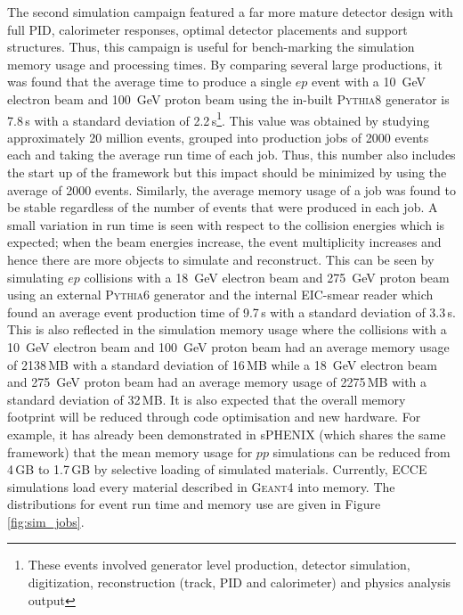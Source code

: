 	The second simulation campaign featured a far more mature detector design with full PID, calorimeter responses, optimal detector placements and support structures. Thus, this campaign is useful for bench-marking the simulation memory usage and processing times. By comparing several large productions, it was found that the average time to produce a single $ep$ event with a 10~GeV electron beam and 100~GeV proton beam using the in-built \textsc{Pythia8} generator is 7.8\,s with a standard deviation of 2.2\,s\footnote{These events involved generator level production, detector simulation, digitization, reconstruction (track, PID and calorimeter) and physics analysis output}. This value was obtained by studying approximately 20 million events, grouped into production jobs of 2000 events each and taking the average run time of each job. Thus, this number also includes the start up of the framework but this impact should be minimized by using the average of 2000 events. Similarly, the average memory usage of a job was found to be stable regardless of the number of events that were produced in each job. A small variation in run time is seen with respect to the collision energies which is expected; when the beam energies increase, the event multiplicity increases and hence there are more objects to simulate and reconstruct. This can be seen by simulating $ep$ collisions with a 18~GeV electron beam and 275~GeV proton beam using an external \textsc{Pythia6} generator and the internal EIC-smear reader which found an average event production time of 9.7\,s with a standard deviation of 3.3\,s. This is also reflected in the simulation memory usage where the collisions with a 10~GeV electron beam and 100~GeV proton beam had an average memory usage of 2138\,MB with a standard deviation of 16\,MB while a 18~GeV electron beam and 275~GeV proton beam had an average memory usage of 2275\,MB with a standard deviation of 32\,MB. It is also expected that the overall memory footprint will be reduced through code optimisation and new hardware. For example, it has already been demonstrated in sPHENIX (which shares the same framework) that the mean memory usage for $pp$ simulations can be reduced from 4\,GB to 1.7\,GB by selective loading of simulated materials. Currently, ECCE simulations load every material described in \textsc{Geant4} into memory. The distributions for event run time and memory use are given in Figure \ref{fig:sim_jobs}.


